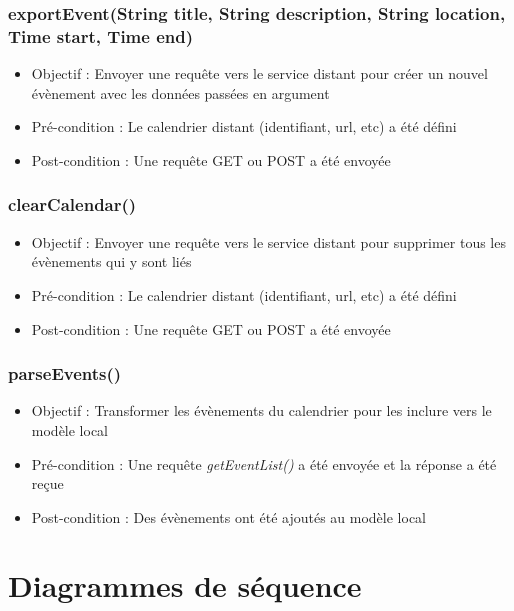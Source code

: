{			\subsubsection{exportEvent(String title, String description, String location, Time start, Time end)}
				\begin{itemize}
					\item Objectif  : Envoyer une requête vers le service distant pour créer un nouvel évènement avec les données passées en argument
					\item Pré-condition : Le calendrier distant (identifiant, url, etc) a été défini
					\item Post-condition : Une requête GET ou POST a été envoyée
				\end{itemize}
				
			\subsubsection{clearCalendar()}
				\begin{itemize}
					\item Objectif  : Envoyer une requête vers le service distant pour supprimer tous les évènements qui y sont liés
					\item Pré-condition : Le calendrier distant (identifiant, url, etc) a été défini
					\item Post-condition : Une requête GET ou POST a été envoyée
				\end{itemize}
				
			\subsubsection{parseEvents()}
				\begin{itemize}
					\item Objectif  : Transformer les évènements du calendrier pour les inclure vers le modèle local
					\item Pré-condition : Une requête \emph{getEventList()} a été envoyée et la réponse a été reçue
					\item Post-condition : Des évènements ont été ajoutés au modèle local
				\end{itemize}
				
	\section{Diagrammes de séquence}
}
